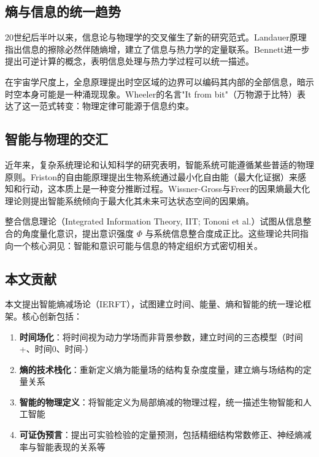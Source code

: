 \documentclass[12pt,a4paper]{article}
\begin{document}
\subsection{熵与信息的统一趋势}

20世纪后半叶以来，信息论与物理学的交叉催生了新的研究范式。Landauer原理指出信息的擦除必然伴随熵增，建立了信息与热力学的定量联系。Bennett\cite{Bennett1982}进一步提出可逆计算的概念，表明信息处理与热力学过程可以统一描述。

在宇宙学尺度上，全息原理\cite{tHooft1993,Susskind1995}提出时空区域的边界可以编码其内部的全部信息，暗示时空本身可能是一种涌现现象。Wheeler的名言"It from bit"（万物源于比特）表达了这一范式转变：物理定律可能源于信息约束。

\subsection{智能与物理的交汇}

近年来，复杂系统理论和认知科学的研究表明，智能系统可能遵循某些普适的物理原则。Friston\cite{Friston2010}的自由能原理提出生物系统通过最小化自由能（最大化证据）来感知和行动，这本质上是一种变分推断过程。Wissner-Gross与Freer\cite{WissnerGross2013}的因果熵最大化理论则提出智能系统倾向于最大化其未来可达状态空间的因果熵。

整合信息理论（Integrated Information Theory, IIT; Tononi et al.\cite{Tononi2016}）试图从信息整合的角度量化意识，提出意识强度 $\Phi$ 与系统信息整合度成正比。这些理论共同指向一个核心洞见：智能和意识可能与信息的特定组织方式密切相关。

\subsection{本文贡献}

本文提出智能熵减场论（IERFT），试图建立时间、能量、熵和智能的统一理论框架。核心创新包括：

\begin{enumerate}
\item \textbf{时间场化}：将时间视为动力学场而非背景参数，建立时间的三态模型（时间+、时间0、时间-）
\item \textbf{熵的技术栈化}：重新定义熵为能量场的结构复杂度度量，建立熵与场结构的定量关系
\item \textbf{智能的物理定义}：将智能定义为局部熵减的物理过程，统一描述生物智能和人工智能
\item \textbf{可证伪预言}：提出可实验检验的定量预测，包括精细结构常数修正、神经熵减率与智能表现的关系等
\end{enumerate}
\end{document}
